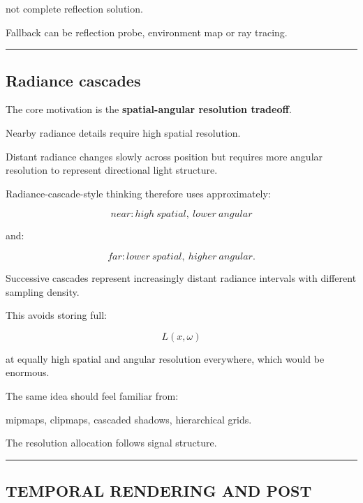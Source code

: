 not complete reflection solution.

Fallback can be reflection probe, environment map or ray tracing.

\begin{center}\rule{0.5\linewidth}{0.5pt}\end{center}

\subsection{Radiance cascades}\label{04-visual-computing-ii-ch040-radiance-cascades}

\hypertarget{04-visual-computing-ii-ch040-radiance-cascades}{}

The core motivation is the \textbf{spatial-angular resolution tradeoff}.

Nearby radiance details require high spatial resolution.

Distant radiance changes slowly across position but requires more angular resolution to represent directional light structure.

Radiance-cascade-style thinking therefore uses approximately:

\[
\boxed{
near:
high\ spatial,\ lower\ angular
}
\]

and:

\[
\boxed{
far:
lower\ spatial,\ higher\ angular.
}
\]

Successive cascades represent increasingly distant radiance intervals with different sampling density.

This avoids storing full:

\[
L(x,\omega)
\]

at equally high spatial and angular resolution everywhere, which would be enormous.

The same idea should feel familiar from:

mipmaps, clipmaps, cascaded shadows, hierarchical grids.

The resolution allocation follows signal structure.

\begin{center}\rule{0.5\linewidth}{0.5pt}\end{center}

\subsection{TEMPORAL RENDERING AND POST}\label{04-visual-computing-ii-ch040-temporal-rendering-and-post}

